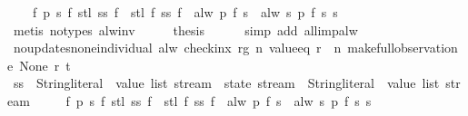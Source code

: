 \begin{isabellebody}
\ \ \ \ {\isachardoublequoteopen}{\isasymforall}f\ p\ s{\isachardot}\ f\ {\isacharparenleft}stl\ {\isacharparenleft}ss\ f{\isacharparenright}{\isacharparenright}\ {\isasymnoteq}\ stl\ {\isacharparenleft}f\ {\isacharparenleft}ss\ f{\isacharparenright}{\isacharparenright}\ {\isasymor}\ alw\ p\ {\isacharparenleft}f\ s{\isacharparenright}\ {\isacharequal}\ alw\ {\isacharparenleft}{\isasymlambda}s{\isachardot}\ p\ {\isacharparenleft}f\ s{\isacharparenright}{\isacharparenright}\ s{\isachardoublequoteclose}\isanewline
\ \ \ \ \isamarkupfalse%
\ {\isacharparenleft}metis\ {\isacharparenleft}no{\isacharunderscore}types{\isacharparenright}\ alw{\isacharunderscore}inv{\isacharparenright}\isanewline
\ \ \isamarkupfalse%
\ \isamarkupfalse%
\ {\isacharquery}thesis\isanewline
\ \ \ \ \isamarkupfalse%
\ {\isacharparenleft}simp\ add{\isacharcolon}\ all{\isacharunderscore}imp{\isacharunderscore}alw{\isacharparenright}\isanewline
{}\isamarkupfalse%
%
\endisatagproof
{\isafoldproof}%
%
\isadelimproof
\isanewline
%
\endisadelimproof
\isanewline
{}\isamarkupfalse%
\ no{\isacharunderscore}updates{\isacharunderscore}none{\isacharunderscore}individual{\isacharcolon}\ {\isachardoublequoteopen}alw\ {\isacharparenleft}check{\isacharunderscore}inx\ rg\ n\ value{\isacharunderscore}eq\ {\isacharparenleft}r\ {\isachardollar}\ n{\isacharparenright}{\isacharparenright}\ {\isacharparenleft}make{\isacharunderscore}full{\isacharunderscore}observation\ e\ None\ r\ t{\isacharparenright}{\isachardoublequoteclose}\isanewline
%
\isadelimproof
%
\endisadelimproof
%
\isatagproof
{}\isamarkupfalse%
\ {\isacharminus}\isanewline
\ \ \isamarkupfalse%
\ ss\ {\isacharcolon}{\isacharcolon}\ {\isachardoublequoteopen}{\isacharparenleft}{\isacharparenleft}String{\isachardot}literal\ {\isasymtimes}\ value\ list{\isacharparenright}\ stream\ {\isasymRightarrow}\ state\ stream{\isacharparenright}\ {\isasymRightarrow}\ {\isacharparenleft}String{\isachardot}literal\ {\isasymtimes}\ value\ list{\isacharparenright}\ stream{\isachardoublequoteclose}\ \isanewline
\ \ \ \ {\isachardoublequoteopen}{\isasymforall}f\ p\ s{\isachardot}\ f\ {\isacharparenleft}stl\ {\isacharparenleft}ss\ f{\isacharparenright}{\isacharparenright}\ {\isasymnoteq}\ stl\ {\isacharparenleft}f\ {\isacharparenleft}ss\ f{\isacharparenright}{\isacharparenright}\ {\isasymor}\ alw\ p\ {\isacharparenleft}f\ s{\isacharparenright}\ {\isacharequal}\ alw\ {\isacharparenleft}{\isasymlambda}s{\isachardot}\ p\ {\isacharparenleft}f\ s{\isacharparenright}{\isacharparenright}\ s{\isachardoublequoteclose}\isanewline

\end{isabellebody}
